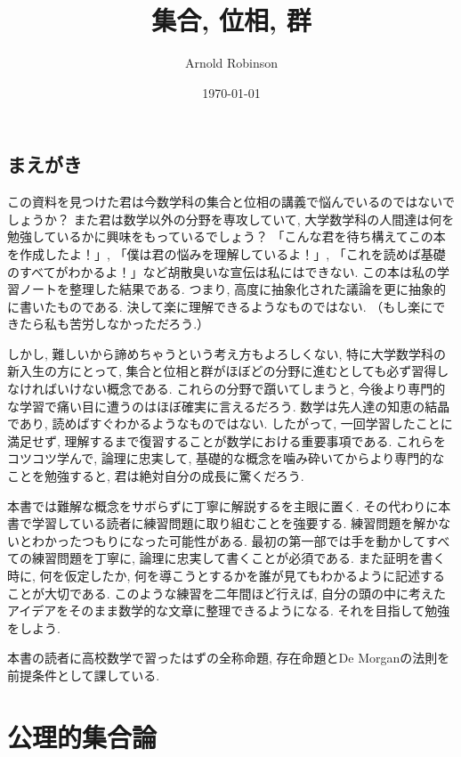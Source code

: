 \documentclass[lualatex]{ltjsbook}
\theoremstyle{remark}
\theoremstyle{plain}
\begin{document}
\title{集合, 位相, 群}
\author{Arnold Robinson}
\date{\today}
\maketitle

\chapter*{まえがき}

この資料を見つけた君は今数学科の集合と位相の講義で悩んでいるのではないでしょうか？
また君は数学以外の分野を専攻していて, 大学数学科の人間達は何を勉強しているかに興味をもっているでしょう？ 
「こんな君を待ち構えてこの本を作成したよ！」, 「僕は君の悩みを理解しているよ！」, 「これを読めば基礎のすべてがわかるよ！」など胡散臭いな宣伝は私にはできない. 
この本は私の学習ノートを整理した結果である. つまり, 高度に抽象化された議論を更に抽象的に書いたものである. 決して楽に理解できるようなものではない. （もし楽にできたら私も苦労しなかっただろう.）



しかし, 難しいから諦めちゃうという考え方もよろしくない, 特に大学数学科の新入生の方にとって, 集合と位相と群がほぼどの分野に進むとしても必ず習得しなければいけない概念である. これらの分野で躓いてしまうと,
今後より専門的な学習で痛い目に遭うのはほぼ確実に言えるだろう. 
数学は先人達の知恵の結晶であり, 読めばすぐわかるようなものではない. したがって, 一回学習したことに満足せず, 理解するまで復習することが数学における重要事項である. これらをコツコツ学んで, 論理に忠実して, 基礎的な概念を噛み砕いてからより専門的なことを勉強すると, 君は絶対自分の成長に驚くだろう.



本書では難解な概念をサボらずに丁寧に解説するを主眼に置く. その代わりに本書で学習している読者に練習問題に取り組むことを強要する. 練習問題を解かないとわかったつもりになった可能性がある. 最初の第一部では手を動かしてすべての練習問題を丁寧に, 論理に忠実して書くことが必須である. また証明を書く時に, 何を仮定したか, 何を導こうとするかを誰が見てもわかるように記述することが大切である. このような練習を二年間ほど行えば, 自分の頭の中に考えたアイデアをそのまま数学的な文章に整理できるようになる. それを目指して勉強をしよう.

本書の読者に高校数学で習ったはずの全称命題, 存在命題とDe Morganの法則を前提条件として課している.



\tableofcontents
{}

\part{公理的集合論}
\end{document}
